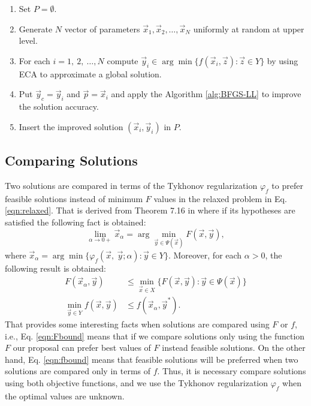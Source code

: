 \documentclass[conference]{IEEEtran}
\theoremstyle{definition}
\begin{document}
\begin{enumerate}
    \item Set $P = \emptyset $.
    \item Generate $N$ vector of parameters $\vec{x}_1, \vec{x}_2, \ldots, \vec{x}_N$
          uniformly at random at upper level.
    \item For each $i=1,\ 2,\ \ldots,N$ compute
            $\vec{y}_i \in \arg \min \{ f(\vec{x}_i, \vec{z}) : \vec{z} \in Y \}$
          by using ECA to approximate a global solution.
    \item Put $\vec{y}_c = \vec{y}_i$ and $\vec{p} = \vec{x}_i$ and apply the
          Algorithm \ref{alg:BFGS-LL} to improve the solution accuracy.
    \item Insert the improved solution $(\vec{x}_i, \vec{y}_i)$ in $P$.
\end{enumerate}

\subsection{Comparing Solutions} %
\label{sub:comparing_solutions}

Two solutions are compared in terms of the Tykhonov regularization $\varphi_f$
to prefer feasible solutions instead of minimum $F$ values in the relaxed problem
in Eq. \ref{eqn:relaxed}. That is derived from Theorem 7.16 in \cite{dempe2002foundations}
where if its hypotheses are satisfied the following fact is obtained:
% 
\[
    \lim_{\alpha \to 0+} \vec{x}_\alpha = \arg \min_{\vec{y} \in \Psi(\vec{x})} F(\vec{x}, \vec{y}),
\]
%
where $\vec{x}_\alpha = \arg \min\{\varphi_f (\vec{x},\ \vec{y}; \alpha) : \vec{y} \in Y\} $.
Moreover, for each $\alpha > 0$, the following result is obtained:
% 
\begin{align}
    \label{eqn:Fbound}
    F(\vec{x}_\alpha, \vec{y}) &\leq \min_{ \vec{x} \in X} \{ F(\vec{x}, \vec{y}) : \vec{y} \in \Psi(\vec{x}) \} \\
    \label{eqn:fbound}
    \min_{\vec{y} \in Y } f(\vec{x}, \vec{y}) &\leq f(\vec{x}_\alpha, \vec{y}^*).
\end{align}
% 
That provides some interesting facts when solutions are compared using $F$ or $f$,
i.e.,  Eq. \ref{eqn:Fbound} means that if we compare solutions only using the
function $F$ our proposal can prefer best values of $F$ instead feasible solutions.
On the other hand, Eq. \ref{eqn:fbound} means that feasible solutions will be
preferred when two solutions are compared only in  terms of $f$. Thus, it is
necessary compare solutions using both objective functions, and we use the Tykhonov
regularization $\varphi_f$ when the optimal values are unknown.
\end{document}
